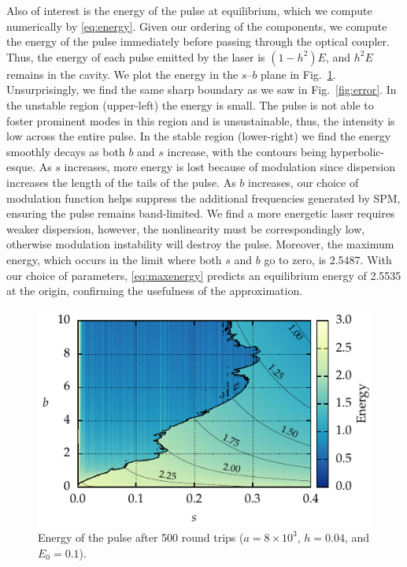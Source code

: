 \documentclass[9pt,twocolumn,twoside]{osajnl}
\begin{document}
Also of interest is the energy of the pulse at equilibrium, which we compute numerically by \eqref{eq:energy}. Given our ordering of the components, we compute the energy of the pulse immediately before passing through the optical coupler. Thus, the energy of each pulse emitted by the laser is $(1 - h^2) E$, and $h^2 E$ remains in the cavity. We plot the energy in the $s$--$b$ plane in Fig.~\ref{fig:energy}. Unsurprisingly, we find the same sharp boundary as we saw in Fig.~\ref{fig:error}. In the unstable region (upper-left) the energy is small. The pulse is not able to foster prominent modes in this region and is unsustainable, thus, the intensity is low across the entire pulse. In the stable region (lower-right) we find the energy smoothly decays as both $b$ and $s$ increase, with the contours being hyperbolic-esque. As $s$ increases, more energy is lost because of modulation since dispersion increases the length of the tails of the pulse. As $b$ increases, our choice of modulation function helps suppress the additional frequencies generated by SPM, ensuring the pulse remains band-limited. We find a more energetic laser requires weaker dispersion, however, the nonlinearity must be correspondingly low, otherwise modulation instability will destroy the pulse. Moreover, the maximum energy, which occurs in the limit where both $s$ and $b$ go to zero, is 2.5487. With our choice of parameters, \eqref{eq:maxenergy} predicts an equilibrium energy of 2.5535 at the origin, confirming the usefulness of the approximation.

\begin{figure}[tbp]
	\centering
	\includegraphics{Figures/ParamSpaceEnergy}
	\caption{Energy of the pulse after 500 round trips ($a = 8 \times 10^3$, $h = 0.04$, and $E_0 = 0.1$).}
	\label{fig:energy}
\end{figure}
\end{document}
